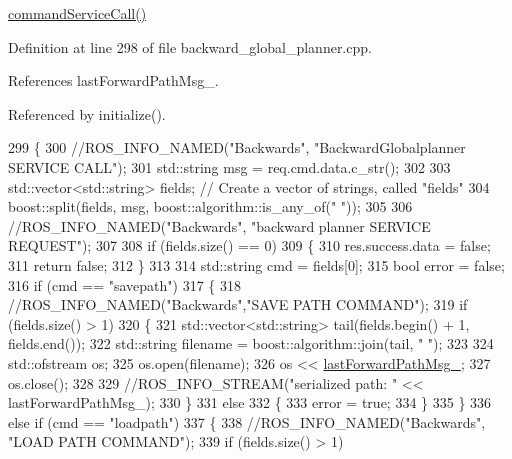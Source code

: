 \hyperlink{classmove__base__z__client_1_1backward__global__planner_1_1BackwardGlobalPlanner_a089a3f34a80d7c6540bdf771eaf409f5}{command\+Service\+Call()} 

Definition at line 298 of file backward\+\_\+global\+\_\+planner.\+cpp.



References last\+Forward\+Path\+Msg\+\_\+.



Referenced by initialize().


\begin{DoxyCode}
299 \{
300     \textcolor{comment}{//ROS\_INFO\_NAMED("Backwards", "BackwardGlobalplanner SERVICE CALL");}
301     std::string msg = req.cmd.data.c\_str();
302 
303     std::vector<std::string> fields; \textcolor{comment}{// Create a vector of strings, called "fields"}
304     boost::split(fields, msg, boost::algorithm::is\_any\_of(\textcolor{stringliteral}{" "}));
305 
306     \textcolor{comment}{//ROS\_INFO\_NAMED("Backwards", "backward planner SERVICE REQUEST");}
307 
308     \textcolor{keywordflow}{if} (fields.size() == 0)
309     \{
310         res.success.data = \textcolor{keyword}{false};
311         \textcolor{keywordflow}{return} \textcolor{keyword}{false};
312     \}
313 
314     std::string cmd = fields[0];
315     \textcolor{keywordtype}{bool} error = \textcolor{keyword}{false};
316     \textcolor{keywordflow}{if} (cmd == \textcolor{stringliteral}{"savepath"})
317     \{
318         \textcolor{comment}{//ROS\_INFO\_NAMED("Backwards","SAVE PATH COMMAND");}
319         \textcolor{keywordflow}{if} (fields.size() > 1)
320         \{
321             std::vector<std::string> tail(fields.begin() + 1, fields.end());
322             std::string filename = boost::algorithm::join(tail, \textcolor{stringliteral}{" "});
323 
324             std::ofstream os;
325             os.open(filename);
326             os << \hyperlink{classmove__base__z__client_1_1backward__global__planner_1_1BackwardGlobalPlanner_a058da13b9ee6b1d878830503e67de638}{lastForwardPathMsg\_};
327             os.close();
328 
329             \textcolor{comment}{//ROS\_INFO\_STREAM("serialized path: " << lastForwardPathMsg\_);}
330         \}
331         \textcolor{keywordflow}{else}
332         \{
333             error = \textcolor{keyword}{true};
334         \}
335     \}
336     \textcolor{keywordflow}{else} \textcolor{keywordflow}{if} (cmd == \textcolor{stringliteral}{"loadpath"})
337     \{
338         \textcolor{comment}{//ROS\_INFO\_NAMED("Backwards", "LOAD PATH COMMAND");}
339         \textcolor{keywordflow}{if} (fields.size() > 1)

\end{DoxyCode}
